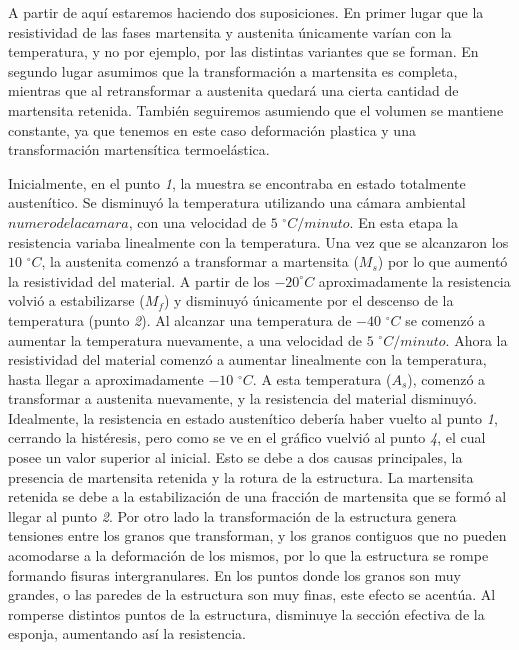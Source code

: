 \documentclass[a4paper,12pt,fleqn,twoside,openany]{book}
\begin{document}
 A partir de aquí estaremos haciendo dos suposiciones. En primer lugar que la resistividad de las fases martensita y austenita únicamente varían con la temperatura, y no por ejemplo, por las distintas variantes que se forman. En segundo lugar asumimos que la transformación a martensita es completa, mientras que al retransformar a austenita quedará una cierta cantidad de martensita retenida. También seguiremos asumiendo que el volumen se mantiene constante, ya que tenemos en este caso deformación plastica y una transformación martensítica termoelástica.
 
 Inicialmente, en el punto \textit{1}, la muestra se encontraba en estado totalmente austenítico. Se disminuyó la temperatura utilizando una cámara ambiental $numero de la camara$, con una velocidad de $5$ $^\circ C/minuto$. En esta etapa la resistencia variaba linealmente con la temperatura.
 Una vez que se alcanzaron los $10$ $^\circ C$, la austenita comenzó a transformar a martensita ($M_s$) por lo que aumentó la resistividad del material. A partir de los $-20^\circ C$ aproximadamente la resistencia volvió a estabilizarse ($M_f$) y disminuyó únicamente por el descenso de la temperatura (punto \textit{2}).     
 Al alcanzar una temperatura de $-40$ $^\circ C$ se comenzó a aumentar la temperatura nuevamente, a una velocidad de $5$ $^\circ C/minuto$. Ahora la resistividad del material comenzó a aumentar linealmente con la temperatura, hasta llegar a aproximadamente $-10$ $^\circ C$. A esta temperatura ($A_s$), comenzó a transformar a austenita nuevamente, y la resistencia del material disminuyó. Idealmente, la resistencia en estado austenítico debería haber vuelto al punto \textit{1}, cerrando la histéresis, pero como se ve en el gráfico vuelvió al punto \textit{4}, el cual posee un valor superior al inicial. Esto se debe a dos causas principales, la presencia de martensita retenida y la rotura de la estructura. La martensita retenida se debe a la estabilización de una fracción de martensita que se formó al llegar al punto \textit{2}. Por otro lado la transformación de la estructura genera tensiones entre los granos que transforman, y los granos contiguos que no pueden acomodarse a la deformación de los mismos, por lo que la estructura se rompe formando fisuras intergranulares. En los puntos donde los granos son muy grandes, o las paredes de la estructura son muy finas, este efecto se acentúa. Al romperse distintos puntos de la estructura, disminuye la sección efectiva de la esponja, aumentando así la resistencia.
\end{document}
